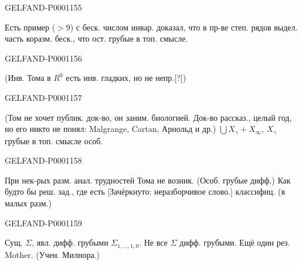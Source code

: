 \begin{GelfandAdjacentEvidence}{GELFAND-P000115}{5}


Есть пример ($>9$) с беск. числом инвар.
\noindent{} доказал, что в пр-ве степ. рядов выдел. часть коразм. беск.,
что ост. грубые в топ. смысле.
\end{GelfandAdjacentEvidence}
\begin{GelfandAdjacentEvidence}{GELFAND-P000115}{6}

(Инв. Тома в $R^9$ есть инв. гладких, но не непр.[?])
\end{GelfandAdjacentEvidence}
\begin{GelfandAdjacentEvidence}{GELFAND-P000115}{7}

(Том не хочет публик. док-во, он заним. биологией.
Док-во рассказ., целый год, но его никто не понял:
Malgrange, Cartan, Арнольд и др.)
$\bigcup X_\gamma+X_\infty$, $X_\gamma$ грубые в топ. смысле особ.
\end{GelfandAdjacentEvidence}
\begin{GelfandAdjacentEvidence}{GELFAND-P000115}{8}

При нек-рых разм. анал. трудностей Тома не возник.
(Особ. грубые дифф.)
Как будто бы реш. зад., где есть
[Зачёркнуто: неразборчивое слово.]
классифиц. (в малых разм.)
\end{GelfandAdjacentEvidence}
\begin{GelfandAdjacentEvidence}{GELFAND-P000115}{9}

Сущ. $\Sigma$, явл. дифф. грубыми $\Sigma_{1,\ldots,1,0}$.
Не все $\Sigma$ дифф. грубыми.
Ещё один рез. Mother. (Учен. Милнора.)
\end{GelfandAdjacentEvidence}
